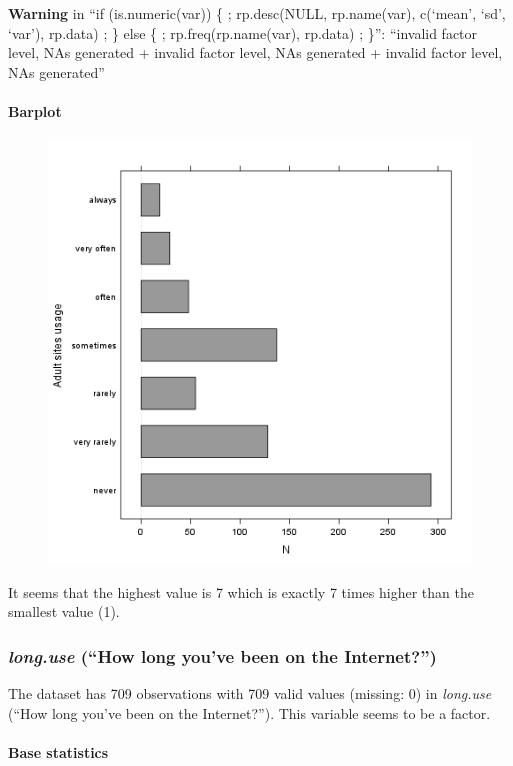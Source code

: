 \documentclass{article}
\makeatletter
\def\maxwidth{\ifdim\Gin@nat@width>\linewidth\linewidth
\else\Gin@nat@width\fi}
\let\Oldincludegraphics\includegraphics
\renewcommand{\includegraphics}[1]{\Oldincludegraphics[width=\maxwidth]{#1}}
\makeatother
\begin{document}
\textbf{Warning} in ``if (is.numeric(var)) \{ ; rp.desc(NULL,
rp.name(var), c(`mean', `sd', `var'), rp.data) ; \} else \{ ;
rp.freq(rp.name(var), rp.data) ; \}'': ``invalid factor level, NAs
generated + invalid factor level, NAs generated + invalid factor level,
NAs generated''

\paragraph{Barplot}

\begin{figure}[htbp]
\centering
\includegraphics{053614b5b842759f559adcc0da8cc645.png}
\caption{}
\end{figure}

It seems that the highest value is 7 which is exactly 7 times higher
than the smallest value (1).

\subsubsection{\emph{long.use} (``How long you've been on the
Internet?'')}

The dataset has 709 observations with 709 valid values (missing: 0) in
\emph{long.use} (``How long you've been on the Internet?''). This
variable seems to be a factor.

\paragraph{Base statistics}
\end{document}

